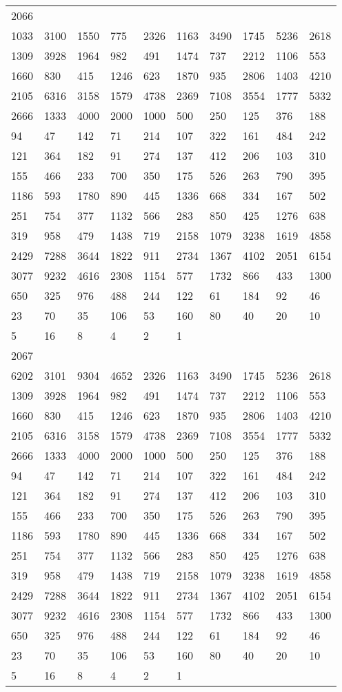 \begin{longtable}{*{10}{l}}
2066&&&&&&&&&\\
1033& 3100& 1550& 775& 2326& 1163& 3490& 1745& 5236& 2618\\
1309& 3928& 1964& 982& 491& 1474& 737& 2212& 1106& 553\\
1660& 830& 415& 1246& 623& 1870& 935& 2806& 1403& 4210\\
2105& 6316& 3158& 1579& 4738& 2369& 7108& 3554& 1777& 5332\\
2666& 1333& 4000& 2000& 1000& 500& 250& 125& 376& 188\\
94& 47& 142& 71& 214& 107& 322& 161& 484& 242\\
121& 364& 182& 91& 274& 137& 412& 206& 103& 310\\
155& 466& 233& 700& 350& 175& 526& 263& 790& 395\\
1186& 593& 1780& 890& 445& 1336& 668& 334& 167& 502\\
251& 754& 377& 1132& 566& 283& 850& 425& 1276& 638\\
319& 958& 479& 1438& 719& 2158& 1079& 3238& 1619& 4858\\
2429& 7288& 3644& 1822& 911& 2734& 1367& 4102& 2051& 6154\\
3077& 9232& 4616& 2308& 1154& 577& 1732& 866& 433& 1300\\
650& 325& 976& 488& 244& 122& 61& 184& 92& 46\\
23& 70& 35& 106& 53& 160& 80& 40& 20& 10\\
5& 16& 8& 4& 2& 1& \\

2067&&&&&&&&&\\
6202& 3101& 9304& 4652& 2326& 1163& 3490& 1745& 5236& 2618\\
1309& 3928& 1964& 982& 491& 1474& 737& 2212& 1106& 553\\
1660& 830& 415& 1246& 623& 1870& 935& 2806& 1403& 4210\\
2105& 6316& 3158& 1579& 4738& 2369& 7108& 3554& 1777& 5332\\
2666& 1333& 4000& 2000& 1000& 500& 250& 125& 376& 188\\
94& 47& 142& 71& 214& 107& 322& 161& 484& 242\\
121& 364& 182& 91& 274& 137& 412& 206& 103& 310\\
155& 466& 233& 700& 350& 175& 526& 263& 790& 395\\
1186& 593& 1780& 890& 445& 1336& 668& 334& 167& 502\\
251& 754& 377& 1132& 566& 283& 850& 425& 1276& 638\\
319& 958& 479& 1438& 719& 2158& 1079& 3238& 1619& 4858\\
2429& 7288& 3644& 1822& 911& 2734& 1367& 4102& 2051& 6154\\
3077& 9232& 4616& 2308& 1154& 577& 1732& 866& 433& 1300\\
650& 325& 976& 488& 244& 122& 61& 184& 92& 46\\
23& 70& 35& 106& 53& 160& 80& 40& 20& 10\\
5& 16& 8& 4& 2& 1& \\


\end{longtable}
